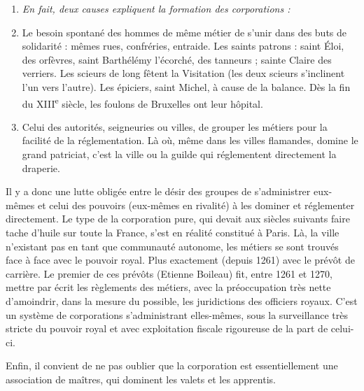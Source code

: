 \documentclass[french,twoside]{book} %
\newlength{\listmod}
\newcommand{\listhead}[1]{\hspace{-1\listmod}\emph{#1}}
\begin{document}
\begin{enumerate}[itemsep=0pt,]
\item[]\listhead{En fait, deux causes expliquent la formation des corporations :}
\item Le besoin spontané des hommes de même métier de s’unir dans des buts de solidarité : mêmes rues, confréries, entraide. Les saints patrons : saint Éloi, des orfèvres, saint Barthélémy l’écorché, des tanneurs ; sainte Claire des verriers. Les scieurs de long fêtent la Visitation (les deux scieurs s’inclinent l’un vers l’autre). Les épiciers, saint Michel, à cause de la balance. Dès la fin du XIII\textsuperscript{e} siècle, les foulons de Bruxelles ont leur hôpital.
\item Celui des autorités, seigneuries ou villes, de grouper les métiers pour la facilité de la réglementation. Là où, même dans les villes flamandes, domine le grand patriciat, c’est la ville ou la guilde qui réglementent directement la draperie.

\end{enumerate}\noindent Il y a donc une lutte obligée entre le désir des groupes de s’administrer eux-mêmes et celui des pouvoirs (eux-mêmes en rivalité) à les dominer et réglementer directement. Le type de la corporation pure, qui devait aux siècles suivants faire tache d’huile sur toute la France, s’est en réalité constitué à Paris. Là, la ville n’existant pas en tant que communauté autonome, les métiers se sont trouvés face à face avec le pouvoir royal. Plus exactement (depuis 1261) avec le prévôt de carrière. Le premier de ces prévôts (Etienne Boileau) fit, entre 1261 et 1270, mettre par écrit les règlements des métiers, avec la préoccupation très nette d’amoindrir,  
\label{p99} dans la mesure du possible, les juridictions des officiers royaux. C’est un système de corporations s’administrant elles-mêmes, sous la surveillance très stricte du pouvoir royal et avec exploitation fiscale rigoureuse de la part de celui-ci.\par
Enfin, il convient de ne pas oublier que la corporation est essentiellement une association de maîtres, qui dominent les valets et les apprentis.\par
\end{document}
